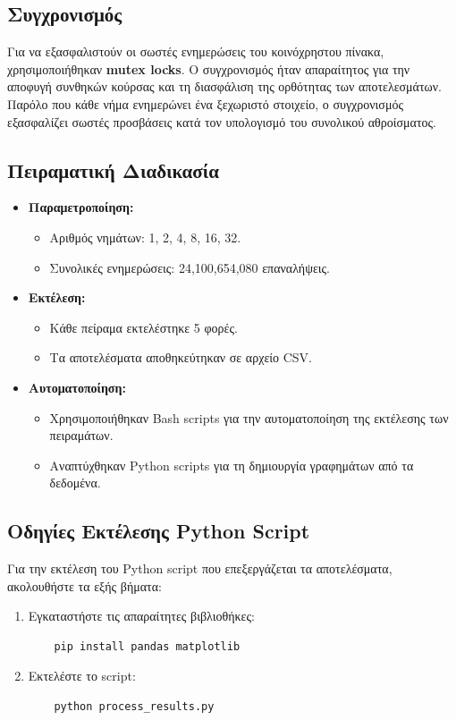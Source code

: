 \documentclass{article}
\begin{document}
\subsection*{Συγχρονισμός}
Για να εξασφαλιστούν οι σωστές ενημερώσεις του κοινόχρηστου πίνακα, χρησιμοποιήθηκαν \textbf{mutex locks}. Ο συγχρονισμός ήταν απαραίτητος για την αποφυγή συνθηκών κούρσας και τη διασφάλιση της ορθότητας των αποτελεσμάτων. Παρόλο που κάθε νήμα ενημερώνει ένα ξεχωριστό στοιχείο, ο συγχρονισμός εξασφαλίζει σωστές προσβάσεις κατά τον υπολογισμό του συνολικού αθροίσματος.
\subsection*{Πειραματική Διαδικασία}
\begin{itemize}
    \item \textbf{Παραμετροποίηση:}
    \begin{itemize}
        \item Αριθμός νημάτων: 1, 2, 4, 8, 16, 32.
        \item Συνολικές ενημερώσεις: 24,100,654,080 επαναλήψεις.
    \end{itemize}
    \item \textbf{Εκτέλεση:}
    \begin{itemize}
        \item Κάθε πείραμα εκτελέστηκε 5 φορές.
        \item Τα αποτελέσματα αποθηκεύτηκαν σε αρχείο CSV.
    \end{itemize}
    \item \textbf{Αυτοματοποίηση:}
    \begin{itemize}
        \item Χρησιμοποιήθηκαν Bash scripts για την αυτοματοποίηση της εκτέλεσης των πειραμάτων.
        \item Αναπτύχθηκαν Python scripts για τη δημιουργία γραφημάτων από τα δεδομένα.
    \end{itemize}
\end{itemize}
\subsection*{Οδηγίες Εκτέλεσης Python Script}
Για την εκτέλεση του Python script που επεξεργάζεται τα αποτελέσματα, ακολουθήστε τα εξής βήματα:
\begin{enumerate}
    \item Εγκαταστήστε τις απαραίτητες βιβλιοθήκες:
    \begin{verbatim}
    pip install pandas matplotlib
    \end{verbatim}
    \item Εκτελέστε το script:
    \begin{verbatim}
    python process_results.py
    \end{verbatim}
\end{enumerate}
\end{document}
